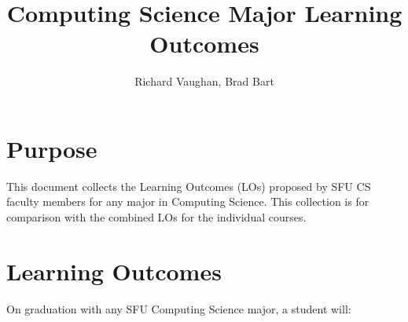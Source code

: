 \documentclass[draft]{article}
\begin{document}
\title{Computing Science Major Learning Outcomes}
\author{Richard Vaughan, Brad Bart}
\maketitle

\section{Purpose}

This document collects the Learning Outcomes (LOs) proposed by SFU CS
faculty members for any major in Computing Science. This collection is
for comparison with the combined LOs for the individual courses.


\section{Learning Outcomes}

On graduation with any SFU Computing Science major, a student will:
\end{document}
